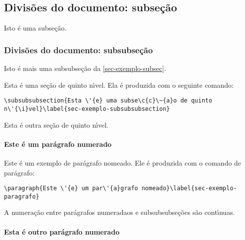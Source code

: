\subsection{Divis\~{o}es do documento: subse\c{c}\~{a}o}\label{sec-exemplo-subsec}

Isto \'{e} uma subse\c{c}\~{a}o.

\subsubsection{Divis\~{o}es do documento: subsubse\c{c}\~{a}o}

Isto \'{e} mais uma subsubse\c{c}\~{a}o da \autoref{sec-exemplo-subsec}.


\label{sec-exemplo-subsubsubsection}

Esta \'{e} uma se\c{c}\~{a}o de quinto n\'{\i}vel. Ela \'{e} produzida com o seguinte comando:

\begin{verbatim}
\subsubsubsection{Esta \'{e} uma subse\c{c}\~{a}o de quinto
n\'{\i}vel}\label{sec-exemplo-subsubsubsection}
\end{verbatim}

\label{sec-exemplo-subsubsubsection-outro}

Esta \'{e} outra se\c{c}\~{a}o de quinto n\'{\i}vel.


\paragraph{Este \'{e} um par\'{a}grafo numerado}\label{sec-exemplo-paragrafo}

Este \'{e} um exemplo de par\'{a}grafo nomeado. Ele \'{e} produzida com o comando de
par\'{a}grafo:

\begin{verbatim}
\paragraph{Este \'{e} um par\'{a}grafo nomeado}\label{sec-exemplo-paragrafo}
\end{verbatim}

A numera\c{c}\~{a}o entre par\'{a}grafos numeradaos e subsubsubse\c{c}\~{o}es s\~{a}o cont\'{\i}nuas.

\paragraph{Esta \'{e} outro par\'{a}grafo numerado}\label{sec-exemplo-paragrafo-outro}

